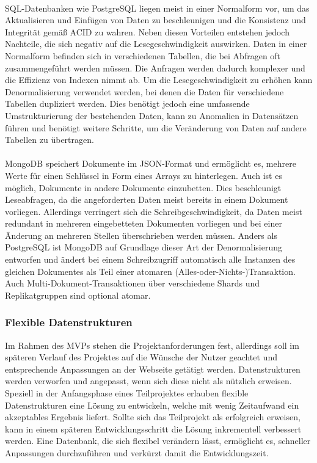 \paragraph{}
SQL-Datenbanken wie PostgreSQL liegen meist in einer Normalform vor, um das Aktualisieren und Einfügen von Daten zu beschleunigen und die Konsistenz und Integrität gemäß ACID zu wahren. %
Neben diesen Vorteilen entstehen jedoch Nachteile, die sich negativ auf die Lesegeschwindigkeit auswirken.
Daten in einer Normalform befinden sich in verschiedenen Tabellen, die bei Abfragen oft zusammengeführt werden müssen.
Die Anfragen werden dadurch komplexer und die Effizienz von Indexen nimmt ab.
Um die Lesegeschwindigkeit zu erhöhen kann Denormalisierung verwendet werden, bei denen die Daten für verschiedene Tabellen dupliziert werden.
Dies benötigt jedoch eine umfassende Umstrukturierung der bestehenden Daten, kann zu Anomalien in Datensätzen führen und benötigt weitere Schritte, um die Veränderung von Daten auf andere Tabellen zu übertragen. %

\paragraph{}
MongoDB speichert Dokumente im JSON-Format und ermöglicht es, mehrere Werte für einen Schlüssel in Form eines Arrays zu hinterlegen.
Auch ist es möglich, Dokumente in andere Dokumente einzubetten. \cite{mongo:embeddedDocuments}
Dies beschleunigt Leseabfragen, da die angeforderten Daten meist bereits in einem Dokument vorliegen.
Allerdings verringert sich die Schreibgeschwindigkeit, da Daten meist redundant in mehreren eingebetteten Dokumenten vorliegen und bei einer Änderung an mehreren Stellen überschrieben werden müssen.
Anders als PostgreSQL ist MongoDB auf Grundlage dieser Art der Denormalisierung entworfen und ändert bei einem Schreibzugriff automatisch alle Instanzen des gleichen Dokumentes als Teil einer atomaren (Alles-oder-Nichts-)Transaktion. %
Auch Multi-Dokument-Transaktionen über verschiedene Shards und Replikatgruppen sind optional atomar. \cite{MG1}

\subsubsection{Flexible Datenstrukturen}
Im Rahmen des MVPs stehen die Projektanforderungen fest, allerdings soll im späteren Verlauf des Projektes auf die Wünsche der Nutzer geachtet und entsprechende Anpassungen an der Webseite getätigt werden.
Datenstrukturen werden verworfen und angepasst, wenn sich diese nicht als nützlich erweisen.
Speziell in der Anfangsphase eines Teilprojektes erlauben flexible Datenstrukturen eine Lösung zu entwickeln, welche mit wenig Zeitaufwand ein akzeptables Ergebnis liefert.
Sollte sich das Teilprojekt als erfolgreich erweisen, kann in einem späteren Entwicklungsschritt die Lösung inkrementell verbessert werden.
Eine Datenbank, die sich flexibel verändern lässt, ermöglicht es, schneller Anpassungen durchzuführen und verkürzt damit die Entwicklungszeit.


